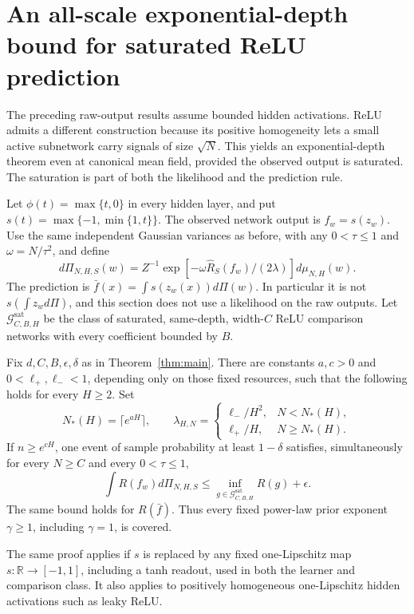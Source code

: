 \section{An all-scale exponential-depth bound for saturated ReLU prediction}
\label{sec:relu-all-scale-depth}
The preceding raw-output results assume bounded hidden activations. ReLU admits a different construction because its positive homogeneity lets a small active subnetwork carry signals of size $\sqrt N$. This yields an exponential-depth theorem even at canonical mean field, provided the observed output is saturated. The saturation is part of both the likelihood and the prediction rule.

Let $\phi(t)=\max\{t,0\}$ in every hidden layer, and put $s(t)=\max\{-1,\min\{1,t\}\}$. The observed network output is $f_w=s(z_w)$. Use the same independent Gaussian variances as before, with any $0<\tau\le1$ and $\omega=N/\tau^2$, and define
\[
 d\Pi_{N,H,S}(w)=Z^{-1}\exp[-\omega\widehat R_S(f_w)/(2\lambda)]d\mu_{N,H}(w).
\]
The prediction is $\bar f(x)=\int s(z_w(x))d\Pi(w)$. In particular it is not $s(\int z_wd\Pi)$, and this section does not use a likelihood on the raw outputs.
Let $\mathcal G^{\mathrm{sat}}_{C,B,H}$ be the class of saturated, same-depth, width-$C$ ReLU comparison networks with every coefficient bounded by $B$.

\begin{theorem}
\label{thm:relu-all-scale-depth}
Fix $d,C,B,\epsilon,\delta$ as in Theorem~\ref{thm:main}. There are constants $a,c>0$ and $0<\ell_+,\ell_-<1$, depending only on those fixed resources, such that the following holds for every $H\ge2$. Set
\[
 N_*(H)=\lceil e^{aH}\rceil,\qquad
 \lambda_{H,N}=
 \begin{cases}\ell_-/H^2,&N<N_*(H),\\
 \ell_+/H,&N\ge N_*(H).
 \end{cases}
\]
If $n\ge e^{cH}$, one event of sample probability at least $1-\delta$ satisfies, simultaneously for every $N\ge C$ and every $0<\tau\le1$,
\[
 \int R(f_w)d\Pi_{N,H,S}
 \le\inf_{g\in\mathcal G^{\mathrm{sat}}_{C,B,H}}R(g)+\epsilon.
\]
The same bound holds for $R(\bar f)$. Thus every fixed power-law prior exponent $\gamma\ge1$, including $\gamma=1$, is covered.
\end{theorem}

The same proof applies if $s$ is replaced by any fixed one-Lipschitz map $s:\mathbb R\to[-1,1]$, including a tanh readout, used in both the learner and comparison class. It also applies to positively homogeneous one-Lipschitz hidden activations such as leaky ReLU.

